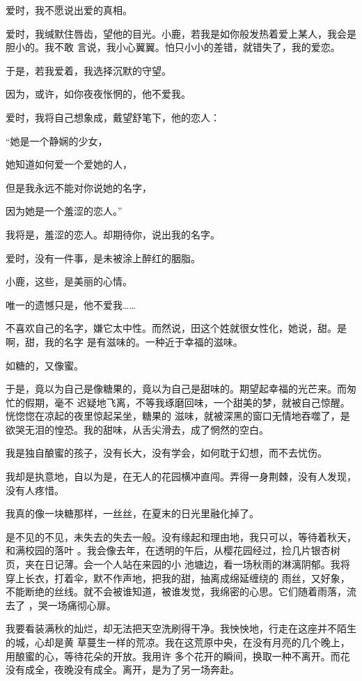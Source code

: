 \documentclass[12pt,a4paper]{article}
\begin{document}
		爱时，我不愿说出爱的真相。

		爱时，我缄默住唇齿，望他的目光。小鹿，若我是如你般发热着爱上某人，我会是胆小的。我不敢
	言说，我小心翼翼。怕只小小的差错，就错失了，我的爱恋。


		于是，若我爱着，我选择沉默的守望。\par
		因为，或许，如你夜夜怅惘的，他不爱我。\par
		爱时，我将自己想象成，戴望舒笔下，他的恋人：\par
		“她是一个静娴的少女，\par
		她知道如何爱一个爱她的人，\par
		但是我永远不能对你说她的名字，\par
		因为她是一个羞涩的恋人。”\par
		我将是，羞涩的恋人。却期待你，说出我的名字。\par
		爱时，没有一件事，是未被涂上醉红的胭脂。\par
		小鹿，这些，是美丽的心情。\par
		唯一的遗憾只是，他不爱我……

	\endwriting



		不喜欢自己的名字，嫌它太中性。而然说，田这个姓就很女性化，她说，甜。是啊，甜，我的名字
	是有滋味的。一种近于幸福的滋味。

		如糖的，又像蜜。

		于是，竟以为自己是像糖果的，竟以为自己是甜味的。期望起幸福的光芒来。而匆忙的假期，毫不
	迟疑地飞离，不等我琢磨回味，一个甜美的梦，就被自己惊醒。恍惚惚在凉起的夜里惊起呆坐，糖果的
	滋味，就被深黑的窗口无情地吞噬了，是欲哭无泪的惶恐。我的甜味，从舌尖滑去，成了惘然的空白。

		我是独自酿蜜的孩子，没有长大，没有学会，如何耽于幻想，而不去忧伤。

		我却是执意地，自以为是，在无人的花园横冲直闯。弄得一身荆棘，没有人发现，没有人疼惜。

		我真的像一块糖那样，一丝丝，在夏末的日光里融化掉了。

		是不见的不见，未失去的失去一般。没有缘起和理由地，我只可以，等待着秋天，和满校园的落叶
	。我会像去年，在透明的午后，从樱花园经过，捡几片银杏树页，夹在日记薄。会一个人站在来园的小
	池塘边，看一场秋雨的淋漓阴郁。我将穿上长衣，打着伞，默不作声地，把我的甜，抽离成绵延缠绕的
	雨丝，又好象，不能断绝的丝线。就不会被谁知道，被谁发觉，我绵密的心思。它们随着雨落，流去了
	，哭一场痛彻心扉。


		我要看装满秋的灿烂，却无法把天空洗刷得干净。我怏怏地，行走在这座并不陌生的城，心却是黄
	草蔓生一样的荒凉。我在这荒原中央，在没有月亮的几个晚上，用酿蜜的心，等待花朵的开放。我用许
	多个花开的瞬间，换取一种不离开。而花没有成全，夜晚没有成全。离开，是为了另一场奔赴。
\end{document}
